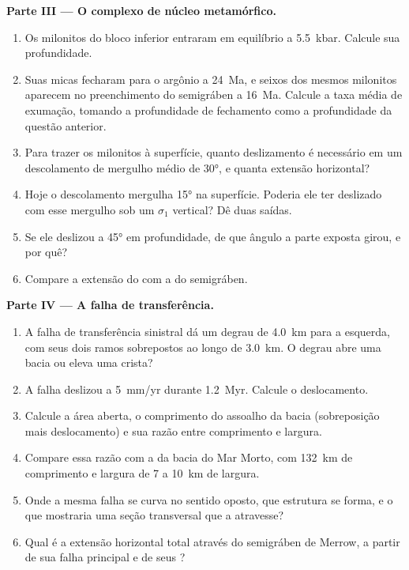 \begin{problem}
\medskip\noindent\textbf{Parte III --- O complexo de núcleo metamórfico.}
\begin{enumerate}[resume]
  \item Os milonitos do bloco inferior entraram em equilíbrio a \qty{5.5}{kbar}. Calcule
        sua profundidade.
  \item Suas micas fecharam para o argônio a \qty{24}{Ma}, e seixos dos mesmos
        milonitos aparecem no preenchimento do semigráben a \qty{16}{Ma}. Calcule a
        taxa média de exumação, tomando a profundidade de fechamento como a profundidade da
        questão anterior.
  \item Para trazer os milonitos à superfície, quanto deslizamento é necessário em um descolamento
        de mergulho médio de \ang{30}, e quanta extensão horizontal?
  \item Hoje o descolamento mergulha \ang{15} na superfície. Poderia ele ter deslizado
        com esse mergulho sob um $\sigma_1$ vertical? Dê duas saídas.
  \item Se ele deslizou a \ang{45} em profundidade, de que ângulo a parte exposta
        girou, e por quê?
  \item Compare a extensão do  com a do
        semigráben.
\end{enumerate}

\medskip\noindent\textbf{Parte IV --- A falha de transferência.}
\begin{enumerate}[resume]
  \item A falha de transferência sinistral dá um degrau de \qty{4.0}{km} para a esquerda, com seus dois
        ramos sobrepostos ao longo de \qty{3.0}{km}. O degrau abre uma bacia
        ou eleva uma crista?
  \item A falha deslizou a \qty{5}{mm/yr} durante \qty{1.2}{Myr}. Calcule
        o deslocamento.
  \item Calcule a área aberta, o comprimento do assoalho da bacia (sobreposição mais
        deslocamento) e sua razão entre comprimento e largura.
  \item Compare essa razão com a da bacia do Mar Morto, com \qty{132}{km} de comprimento e largura de 7
        a \qty{10}{km} de largura.
  \item Onde a mesma falha se curva no sentido oposto, que estrutura se forma, e
        o que mostraria uma seção transversal que a atravesse?
  \item Qual é a extensão horizontal total através do semigráben de Merrow,
        a partir de sua falha principal e de seus ?
\end{enumerate}
\end{problem}

